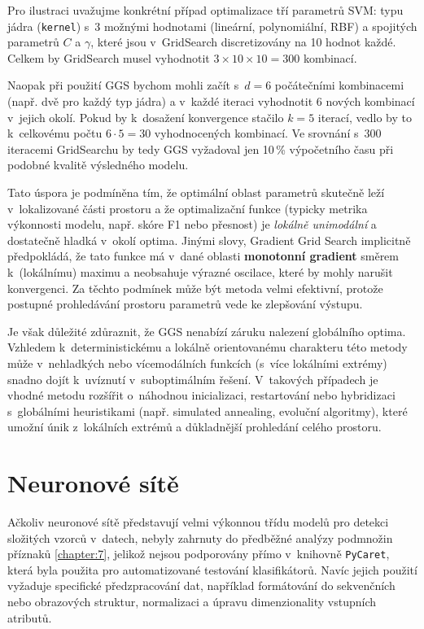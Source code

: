 Pro ilustraci uvažujme konkrétní případ optimalizace tří parametrů SVM: typu jádra (\texttt{kernel}) s~3 možnými hodnotami (lineární, polynomiální, RBF) a spojitých parametrů $C$ a $\gamma$, které jsou v~GridSearch discretizovány na 10 hodnot každé. Celkem by GridSearch musel vyhodnotit $3 \times 10 \times 10 = 300$ kombinací.

Naopak při použití GGS bychom mohli začít s~$d = 6$ počátečními kombinacemi (např. dvě pro každý typ jádra) a v~každé iteraci vyhodnotit 6 nových kombinací v~jejich okolí. Pokud by k~dosažení konvergence stačilo $k = 5$ iterací, vedlo by to k~celkovému počtu $6 \cdot 5 = 30$ vyhodnocených kombinací. Ve srovnání s~300 iteracemi GridSearchu by tedy GGS vyžadoval jen 10\,\% výpočetního času při podobné kvalitě výsledného modelu.

Tato úspora je podmíněna tím, že optimální oblast parametrů skutečně leží v~lokalizované části prostoru a že optimalizační funkce (typicky metrika výkonnosti modelu, např. skóre F1 nebo přesnost) je \textit{lokálně unimodální} a dostatečně hladká v~okolí optima. Jinými slovy, Gradient Grid Search implicitně předpokládá, že tato funkce má v~dané oblasti \textbf{monotonní gradient} směrem k~(lokálnímu) maximu a neobsahuje výrazné oscilace, které by mohly narušit konvergenci. Za těchto podmínek může být metoda velmi efektivní, protože postupné prohledávání prostoru parametrů vede ke zlepšování výstupu.

Je však důležité zdůraznit, že GGS nenabízí záruku nalezení globálního optima. Vzhledem k~deterministickému a lokálně orientovanému charakteru této metody může v~nehladkých nebo vícemodálních funkcích (s~více lokálními extrémy) snadno dojít k~uvíznutí v~suboptimálním řešení. V~takových případech je vhodné metodu rozšířit o~náhodnou inicializaci, restartování nebo hybridizaci s~globálními heuristikami (např. simulated annealing, evoluční algoritmy), které umožní únik z~lokálních extrémů a důkladnější prohledání celého prostoru.










\section{Neuronové sítě}

Ačkoliv neuronové sítě představují velmi výkonnou třídu modelů pro detekci složitých vzorců v~datech, nebyly zahrnuty do předběžné analýzy podmnožin příznaků \ref{chapter:7}, jelikož nejsou podporovány přímo v~knihovně \texttt{PyCaret}, která byla použita pro automatizované testování klasifikátorů. Navíc jejich použití vyžaduje specifické předzpracování dat, například formátování do sekvenčních nebo obrazových struktur, normalizaci a úpravu dimenzionality vstupních atributů.

